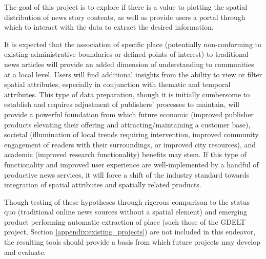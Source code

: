The goal of this project is to explore if there is a value to plotting the spatial distribution of news story contents, as well as provide users a portal through which to interact with the data to extract the desired information.  

It is expected that the association of specific place (potentially non-conforming to existing administrative boundaries or defined points of interest) to traditional news articles will provide an added dimension of understanding to communities at a local level. Users will find additional insights from the ability to view or filter spatial attributes, especially in conjunction with thematic and temporal attributes. This type of data preparation, though it is initially cumbersome to establish and requires adjustment of publishers' processes to maintain, will provide a powerful foundation from which future economic (improved publisher products elevating their offering and attracting/maintaining a customer base), societal (illumination of local trends requiring intervention, improved community engagement of readers with their surroundings, or improved city resources), and academic (improved research functionality) benefits may stem.  If this type of functionality and improved user experience are well-implemented by a handful of productive news services, it will force a shift of the industry standard towards integration of spatial attributes and spatially related products.

Though testing of these hypotheses through rigerous comparison to the status quo (traditional online news sources without a spatial element) and emerging product performing automatic extraction of place (such those of the GDELT project, Section \ref{appendix:existing_projects}) are not included in this endeavor, the resulting tools should provide a basis from which future projects may develop and evaluate.